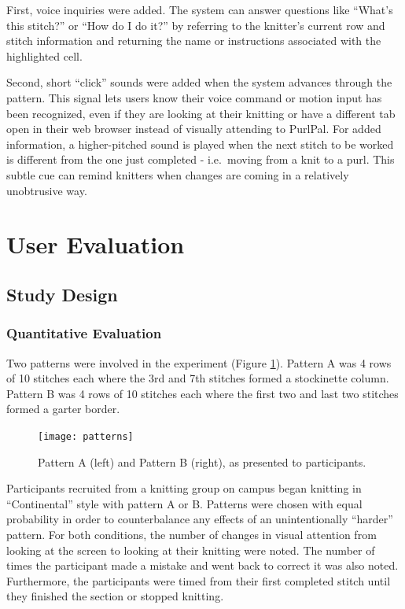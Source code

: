 \documentclass[11pt,twocolumn]{article}
\begin{document}
First, voice inquiries were added.
The system can answer questions like ``What's this stitch?'' or ``How do I do it?'' by referring to the knitter's current row and stitch information and returning the name or instructions associated with the highlighted cell.

Second, short ``click'' sounds were added when the system advances through the pattern.
This signal lets users know their voice command or motion input has been recognized, even if they are looking at their knitting or have a different tab open in their web browser instead of visually attending to PurlPal.
For added information, a higher-pitched sound is played when the next stitch to be worked is different from the one just completed - i.e.\ moving from a knit to a purl.
This subtle cue can remind knitters when changes are coming in a relatively unobtrusive way.

\section{User Evaluation} \label{eval}

\subsection{Study Design}

\subsubsection{Quantitative Evaluation}

Two patterns were involved in the experiment (Figure \ref{patterns}).
Pattern A was 4 rows of 10 stitches each where the 3rd and 7th stitches formed a stockinette column.
Pattern B was 4 rows of 10 stitches each where the first two and last two stitches formed a garter border.

\begin{figure} %
    \centering
    \texttt{[image: patterns]}
    \caption{Pattern A (left) and Pattern B (right), as presented to participants.} \label{patterns}
\end{figure}


Participants recruited from a knitting group on campus began knitting in ``Continental'' style with pattern A or B.
Patterns were chosen with equal probability in order to counterbalance any effects of an unintentionally ``harder'' pattern.
For both conditions, the number of changes in visual attention from looking at the screen to looking at their knitting were noted.
The number of times the participant made a mistake and went back to correct it was also noted.
Furthermore, the participants were timed from their first completed stitch until they finished the section or stopped knitting.
\end{document}
